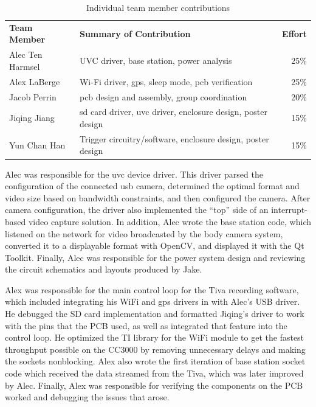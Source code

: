\documentclass[12pt]{article}
\begin{document}
\begin{table}[h]
    \centering
    \caption{Individual team member contributions}
    \begin{tabular}{llr}
        \textbf{Team Member} & \textbf{Summary of Contribution} & \textbf{Effort}\\
        Alec Ten Harmsel & UVC driver, base station, power analysis & 25\%\\
        Alex LaBerge & Wi-Fi driver, \gls{gps}, sleep mode, \gls{pcb} verification & 25\%\\
        Jacob Perrin & \gls{pcb} design and assembly, group coordination & 20\%\\
        Jiqing Jiang & \gls{sd} card driver, \gls{uvc} driver, enclosure design, poster design & 15\%\\
        Yun Chan Han & Trigger circuitry/software, enclosure design, poster design & 15\%\\
    \end{tabular}
    \label{tab:individual_contrib}
\end{table}

Alec was responsible for the \gls{uvc} device driver. This driver parsed the
configuration of the connected \gls{usb} camera, determined the optimal format
and video size based on bandwidth constraints, and then configured the camera.
After camera configuration, the driver also implemented the “top” side of an
interrupt-based video capture solution. In addition, Alec wrote the base
station code, which listened on the network for video broadcasted by the body
camera system, converted it to a displayable format with OpenCV, and displayed
it with the Qt Toolkit. Finally, Alec was responsible for the power system
design and reviewing the circuit schematics and layouts produced by Jake.

Alex was responsible for the main control loop for the Tiva recording software,
which included integrating his WiFi and \gls{gps} drivers in with Alec's USB driver.
He debugged the SD card implementation and formatted Jiqing's driver to work with
the pins that the PCB used, as well as integrated that feature into the control loop. 
He optimized the TI library for the WiFi module to get the fastest throughput
possible on the CC3000 by removing unnecessary delays and making the sockets
nonblocking. Alex also wrote the first iteration of base station socket code
which received the data streamed from the Tiva, which was later improved by
Alec. Finally, Alex was responsible for verifying the components on the PCB
worked and debugging the issues that arose.
\end{document}
